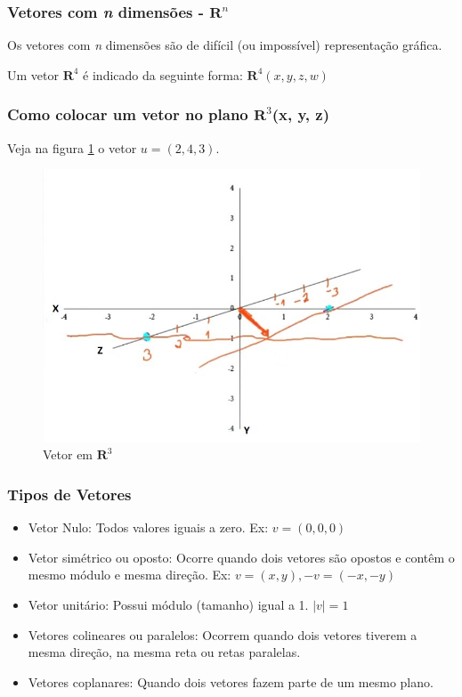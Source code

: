 \documentclass[12pt]{article}
\begin{document}
\subsubsection{Vetores com \textit{n} dimensões - \( \mathbf{R}^{n} \)}

Os vetores com \textit{n} dimensões são de difícil (ou impossível) representação gráfica.

Um vetor \( \mathbf{R}^{4} \) é indicado da seguinte forma: \( \mathbf{R}^{4} (x, y, z, w)\)

\subsubsection{Como colocar um vetor no plano \( \mathbf{R}^{3} \)(x, y, z)}

Veja na figura \ref{fig:vetor r3} o vetor \(u = (2,4,3)\).

\begin{figure}
	\centering
	\includegraphics[width=0.7\linewidth]{figuras/R3}
	\caption[Vetor em \( \mathbf{R}^{3} \)]{Vetor em \( \mathbf{R}^{3} \)}
	\label{fig:vetor r3}
\end{figure}

\subsubsection{Tipos de Vetores}

\singlespacing
\begin{itemize}
	\item Vetor Nulo: Todos valores iguais a zero. Ex: \(v = (0,0,0)\)
	\item Vetor simétrico ou oposto: Ocorre quando dois vetores são opostos e contêm o mesmo módulo e mesma direção. Ex: \(v = (x,y), -v = (-x,-y)\)
	\item Vetor unitário: Possui módulo (tamanho) igual a 1. \(|v| = 1\)
	\item Vetores colineares ou paralelos: Ocorrem quando dois vetores tiverem a mesma direção, na mesma reta ou retas paralelas.
	\item Vetores coplanares: Quando dois vetores fazem parte de um mesmo plano.
\end{itemize}
\onehalfspacing
\pagebreak
\end{document}
